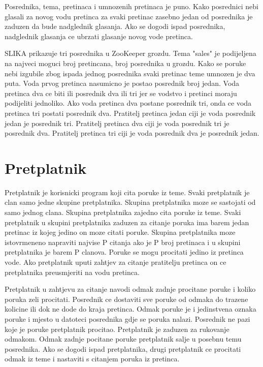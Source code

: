 \documentclass[times, utf8, diplomski, numeric]{fer}
\begin{document}
Posrednika, tema, pretinaca i umnozenih pretinaca je puno. Kako posrednici nebi glasali za novog vodu pretinca za svaki pretinac zasebno jedan od posrednika je zaduzen da bude nadglednik glasanja. Ako se dogodi ispad posrednika, nadglednik glasanja ce ubrzati glasanje novog vode pretinca.  

SLIKA prikazuje tri posrednika u ZooKeeper grozdu. Tema "sales" je podijeljena na najveci moguci broj pretincana, broj posrednika u grozdu. Kako se poruke nebi izgubile zbog ispada jednog posrednika svaki pretinac teme umnozen je dva puta. Voda prvog pretinca nasumicno je postao posrednik broj jedan. Voda pretinca dva ce biti ili posrednik dva ili tri jer se vodstvo i pretinci moraju podijeliti jednoliko. Ako voda pretinca dva postane posrednik tri, onda ce voda pretinca tri postati posrednik dva. Pratitelj pretinca jedan ciji je voda posrednik jedan je posrednik tri. Pratitelj pretinca dva ciji je voda posrednik tri je posrednik dva. Pratitelj pretinca tri ciji je voda posrednik dva je posrednik jedan.



\chapter{Pretplatnik}
Pretplatnik je korisnicki program koji cita poruke iz teme. Svaki pretplatnik je clan samo jedne skupine pretplatnika. Skupina pretplatnika moze se sastojati od samo jednog clana. Skupina pretplatnika zajedno cita poruke iz teme. Svaki pretplatnik u skupini pretplatnika zaduzen za citanje poruka ima barem jedan pretinac iz kojeg jedino on moze citati poruke. Skupina pretplatnika moze istovrmeneno napraviti najvise P citanja ako je P broj pretinaca i u skupini pretplatnika je barem P clanova. Poruke se mogu procitati jedino iz pretinca vode. Ako pretplatnik uputi zahtjev za citanje pratitelju pretinca on ce pretplatnika preusmjeriti na vodu pretinca.

Pretplatnik u zahtjevu za citanje navodi odmak zadnje procitane poruke i koliko poruka zeli procitati. Posrednik ce dostaviti sve poruke od odmaka do trazene kolicine ili dok ne dode do kraja pretinca. Odmak poruke je i jedinstvena oznaka poruke i mjesto u datoteci posrednika gdje se poruka nalazi. Posrednik ne pazi koje je poruke pretplatnik procitao. Pretplatnik je zaduzen za rukovanje odmakom. Odmak zadnje pocitane poruke pretplatnik salje u posebnu temu posrednika. Ako se dogodi ispad pretplatnika, drugi pretplatnik ce procitati odmak iz teme i nastaviti s citanjem poruka iz pretinca.
\end{document}
